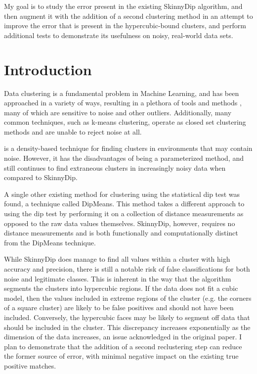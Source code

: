\documentclass{sig-alternate-05-2015}
\begin{document}
My goal is to study the error present in the existing SkinnyDip algorithm, and then augment it with the addition of a second clustering method in an attempt to improve the error that is present in the hypercubic-bound clusters, and perform additional tests to demonstrate its usefulness on noisy, real-world data sets.


\section{Introduction}
Data clustering is a fundamental problem in Machine Learning, and has been approached in a variety of ways, resulting in a plethora of tools and methods \cite{ClusteringMethods}, many of which are sensitive to noise and other outliers. Additionally, many common techniques, such as k-means clustering, operate as closed set clustering methods and are unable to reject noise at all.

\cite{DBSCAN} is a density-based technique for finding clusters in environments that may contain noise. However, it has the disadvantages of being a parameterized method, and still continues to find extraneous clusters in increasingly noisy data when compared to SkinnyDip.

A single other existing method for clustering using the statistical dip test was found, a technique called DipMeans\cite{dipmeans}. This method takes a different approach to using the dip test by performing it on a collection of distance measurements as opposed to the raw data values themselves. SkinnyDip, however, requires no distance measurements  and is both functionally and computationally distinct from the DipMeans technique.

While SkinnyDip does manage to find all values within a cluster with high accuracy and precision, there is still a notable risk of false classifications for both noise and legitimate classes. This is inherent in the way that the algorithm segments the clusters into hypercubic regions. If the data does not fit a cubic model, then the values included in extreme regions of the cluster (e.g. the corners of a square cluster) are likely to be false positives and should not have been included. Conversely, the hypercubic faces may be likely to segment off data that should be included in the cluster.  This discrepancy increases exponentially as the dimension of the data increases, an issue acknowledged in the original paper\cite{skinnydip}. I plan to demonstrate that the addition of a second reclustering step can reduce the former source of error, with minimal negative impact on the existing true positive matches.
\end{document}

